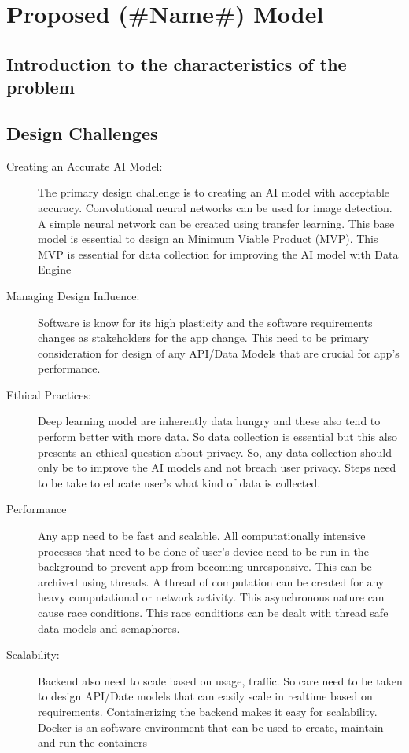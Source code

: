 \documentclass[../Report.tex]{subfiles}
\begin{document}
\chapter{Proposed (\#Name\#) Model}

\section{Introduction to the characteristics of the problem}

\section{Design Challenges}
\begin{description}
    \item[Creating an Accurate AI Model: ] The primary design challenge is to creating an AI model with acceptable accuracy. Convolutional
    neural networks can be used for image detection. A simple neural network can be created using transfer learning. This base model is 
    essential to design an Minimum Viable Product (MVP). This MVP is essential for data collection for improving the AI model with Data 
    Engine
    
    \item[Managing Design Influence: ] Software is know for its high plasticity and the software requirements changes as stakeholders for
    the app change. This need to be primary consideration for design of any API/Data Models that are crucial for app's performance.

    \item[Ethical Practices: ] Deep learning model are inherently data hungry and these also tend to perform better with more data. So
    data collection is essential but this also presents an ethical question about privacy. So, any data collection should only be to 
    improve the AI models and not breach user privacy. Steps need to be take to educate user's what kind of data is collected.

    \item[Performance] Any app need to be fast and scalable. All computationally intensive processes that need to be 
    done of user's device need to be run in the background to prevent app from becoming unresponsive. This can be archived using 
    threads. A thread of computation can be created for any heavy computational or network activity. This asynchronous nature can 
    cause race conditions. This race conditions can be dealt with thread safe data models and semaphores.
    
    \item[Scalability: ]
    Backend also need to scale based on usage, traffic. So care need to be taken to design API/Date models that can easily scale in 
    realtime based on requirements. Containerizing the backend makes it easy for scalability. Docker is an software environment that
    can be used to create, maintain and run the containers
\end{description}
\end{document}

